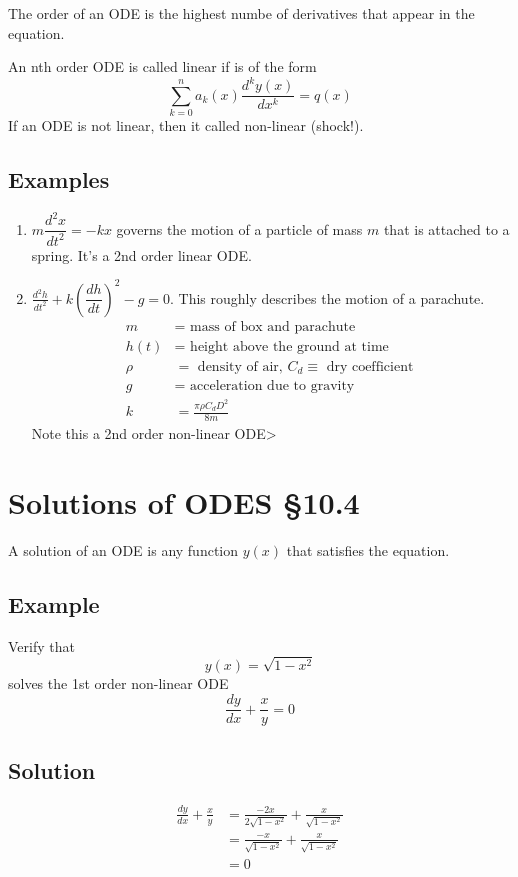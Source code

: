\documentclass[11pt]{article}
\begin{document}
The order of an ODE is the highest numbe of derivatives that appear in the equation.

An nth order ODE is called linear if is of the form
\[ \sum_{k=0}^n a_k(x) \frac{d^k y(x)}{dx^k} = q(x) \]
If an ODE is not linear, then it called non-linear (shock!).

\subsection{Examples}
\begin{enumerate}[ (i) ]
\item $ m \dfrac{d^2 x}{dt^2} = -kx $ governs the motion of a particle of mass $m$ that is attached to a spring. It's a 2nd order linear ODE.

\item $\frac{d^2h}{dt^2} + k \left( \dfrac{dh}{dt} \right)^2 - g = 0$. This roughly describes the motion of a parachute.
\begin{align*}
m &= \text{ mass of box and parachute} \\
h(t) &= \text{ height above the ground at time} \\
\rho &= \text{ density of air, } C_d \equiv \text{ dry coefficient } \\
g &= \text{ acceleration due to gravity } \\
k &= \frac{\pi \rho C_d D^2}{8m}
\end{align*}
Note this a 2nd order non-linear ODE>

\end{enumerate}

\section{Solutions of ODES §10.4}
A solution of an ODE is any function $y(x)$ that satisfies the equation.

\subsection{Example}
Verify that
\[ y(x) = \sqrt{1 - x^2} \]
solves the 1st order non-linear ODE
\[ \frac{dy}{dx} + \frac{x}{y} = 0 \]

\subsection{Solution}
\begin{align*}
\frac{dy}{dx} + \frac{x}{y} &= \frac{-2x}{2\sqrt{1-x^2}} + \frac{x}{\sqrt{1-x^2}} \\
&= \frac{-x}{\sqrt{1-x^2}} + \frac{x}{\sqrt{1-x^2}} \\
&= 0
\end{align*}
\end{document}
